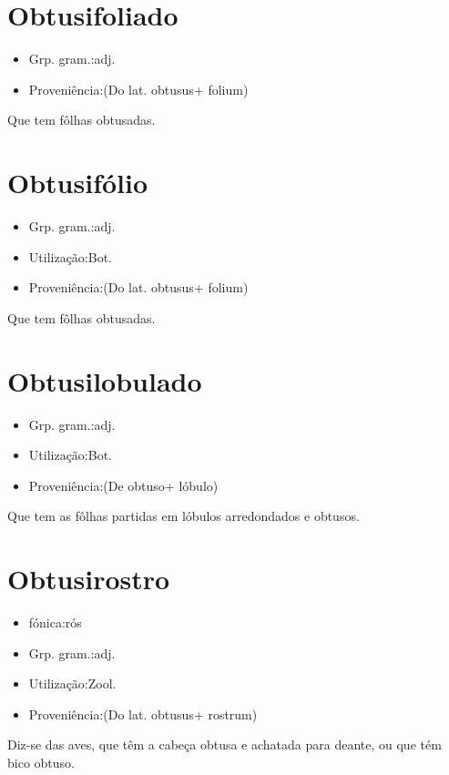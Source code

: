 \section{Obtusifoliado}
\begin{itemize}
\item {Grp. gram.:adj.}
\end{itemize}
\begin{itemize}
\item {Proveniência:(Do lat. \textunderscore obtusus\textunderscore  + \textunderscore folium\textunderscore )}
\end{itemize}
Que tem fôlhas obtusadas.
\section{Obtusifólio}
\begin{itemize}
\item {Grp. gram.:adj.}
\end{itemize}
\begin{itemize}
\item {Utilização:Bot.}
\end{itemize}
\begin{itemize}
\item {Proveniência:(Do lat. \textunderscore obtusus\textunderscore  + \textunderscore folium\textunderscore )}
\end{itemize}
Que tem fôlhas obtusadas.
\section{Obtusilobulado}
\begin{itemize}
\item {Grp. gram.:adj.}
\end{itemize}
\begin{itemize}
\item {Utilização:Bot.}
\end{itemize}
\begin{itemize}
\item {Proveniência:(De \textunderscore obtuso\textunderscore  + \textunderscore lóbulo\textunderscore )}
\end{itemize}
Que tem as fôlhas partidas em lóbulos arredondados e obtusos.
\section{Obtusirostro}
\begin{itemize}
\item {fónica:rós}
\end{itemize}
\begin{itemize}
\item {Grp. gram.:adj.}
\end{itemize}
\begin{itemize}
\item {Utilização:Zool.}
\end{itemize}
\begin{itemize}
\item {Proveniência:(Do lat. \textunderscore obtusus\textunderscore  + \textunderscore rostrum\textunderscore )}
\end{itemize}
Diz-se das aves, que têm a cabeça obtusa e achatada para deante, ou que tém bico obtuso.
